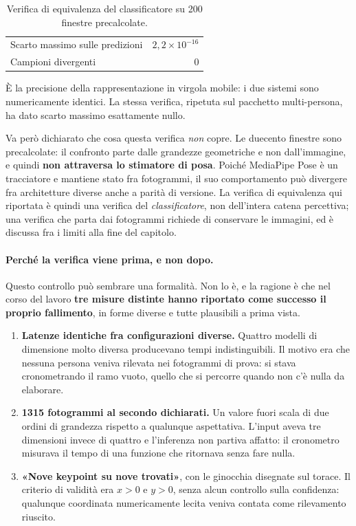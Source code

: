 \begin{table}[ht]
\centering
\caption{Verifica di equivalenza del classificatore su 200 finestre
precalcolate.}
\label{tab:parita}
\begin{tabular}{lr}
\toprule
Scarto massimo sulle predizioni & $2{,}2\times10^{-16}$ \\
Campioni divergenti & 0 \\
\bottomrule
\end{tabular}
\end{table}

È la precisione della rappresentazione in virgola mobile: i due sistemi sono numericamente identici. La stessa verifica, ripetuta sul pacchetto multi-persona, ha dato scarto massimo esattamente nullo.

Va però dichiarato che cosa questa verifica \emph{non} copre. Le duecento finestre sono precalcolate: il confronto parte dalle grandezze geometriche e non dall'immagine, e quindi \textbf{non attraversa lo stimatore di posa}. Poiché MediaPipe Pose è un tracciatore e mantiene stato fra fotogrammi, il suo comportamento può divergere fra architetture diverse anche a parità di versione. La verifica di equivalenza qui riportata è quindi una verifica del \emph{classificatore}, non dell'intera catena percettiva; una verifica che parta dai fotogrammi richiede di conservare le immagini, ed è discussa fra i limiti alla fine del capitolo.

\paragraph{Perché la verifica viene prima, e non dopo.}

Questo controllo può sembrare una formalità. Non lo è, e la ragione è che nel corso del lavoro \textbf{tre misure distinte hanno riportato come successo il proprio fallimento}, in forme diverse e tutte plausibili a prima vista.

\begin{enumerate}

\item \textbf{Latenze identiche fra configurazioni diverse.} Quattro modelli di dimensione molto diversa producevano tempi indistinguibili. Il motivo era che nessuna persona veniva rilevata nei fotogrammi di prova: si stava cronometrando il ramo vuoto, quello che si percorre quando non c'è nulla da elaborare.

\item \textbf{1315 fotogrammi al secondo dichiarati.} Un valore fuori scala di due ordini di grandezza rispetto a qualunque aspettativa. L'input aveva tre dimensioni invece di quattro e l'inferenza non partiva affatto: il cronometro misurava il tempo di una funzione che ritornava senza fare nulla.

\item \textbf{«Nove keypoint su nove trovati»}, con le ginocchia disegnate sul torace. Il criterio di validità era $x > 0$ e $y > 0$, senza alcun controllo sulla confidenza: qualunque coordinata numericamente lecita veniva contata come rilevamento riuscito.

\end{enumerate}

